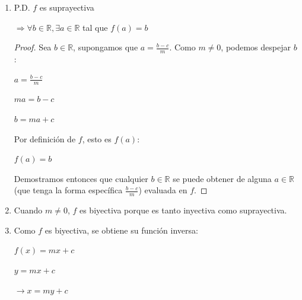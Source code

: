 \documentclass{article}
\begin{document}
\begin{enumerate}
\begin{enumerate}
\begin{itemize}
\begin{enumerate}
\begin{proof}
                \(ma = mb\)
                \vspace{\baselineskip}
                
                Cuando \(m \neq 0\) podemos dividir ambos lados, entonces:
                
                \(a = b\)
                
                \end{proof}
                \item[2.] P.D. \(f\) es suprayectiva
                
                \(\Rightarrow \forall b \in \mathbb{R}, \exists a \in \mathbb{R}\) tal que \(f(a) = b\)
                
                \begin{proof} Sea \(b \in \mathbb{R}\), supongamos que \(a = \frac{b-c}{m}\). Como \(m \neq 0\), podemos despejar \(b\):
                
                \(a = \frac{b-c}{m}\)
                
                \(ma = b-c\)
                
                \(b = ma + c\)
                \vspace{\baselineskip}
                
                Por definición de \(f\), esto es \(f(a)\):
                
                \(f(a) = b\)
                \vspace{\baselineskip}
                
                Demostramos entonces que cualquier \(b \in \mathbb{R}\) se puede obtener de alguna \(a \in \mathbb{R}\) (que tenga la forma específica \(\frac{b-c}{m}\)) evaluada en \(f\).

                \end{proof}
                \item[3.] Cuando \(m \neq 0\), \(f\) es biyectiva porque es tanto inyectiva como suprayectiva.
                \item[4.] Como \(f\) es biyectiva, se obtiene su función inversa:
                
                \(f(x) = mx + c\)
                
                \(y = mx + c\)
                \vspace{\baselineskip}
                
                \(\rightarrow x = my + c\)
                

\end{enumerate}
\end{itemize}
\end{enumerate}
\end{enumerate}
\end{document}
